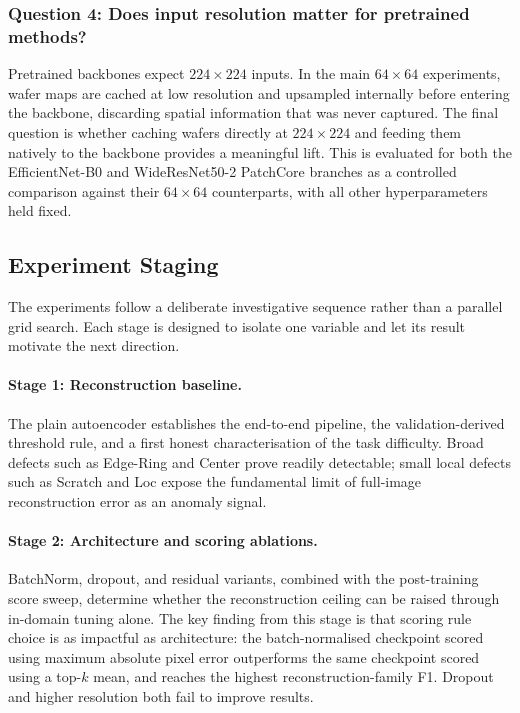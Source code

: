 \documentclass[11pt]{article}
\begin{document}
\subsubsection{Question 4: Does input resolution matter for pretrained methods?}

Pretrained backbones expect $224\!\times\!224$ inputs. In the main
$64\!\times\!64$ experiments, wafer maps are cached at low resolution and
upsampled internally before entering the backbone, discarding spatial
information that was never captured. The final question is whether caching
wafers directly at $224\!\times\!224$ and feeding them natively to the backbone
provides a meaningful lift. This is evaluated for both the EfficientNet-B0
and WideResNet50-2 PatchCore branches as a controlled comparison against
their $64\!\times\!64$ counterparts, with all other hyperparameters held fixed.

\subsection{Experiment Staging}

The experiments follow a deliberate investigative sequence rather than a
parallel grid search. Each stage is designed to isolate one variable and let
its result motivate the next direction.

\paragraph{Stage 1: Reconstruction baseline.}
The plain autoencoder establishes the end-to-end pipeline, the validation-derived
threshold rule, and a first honest characterisation of the task difficulty.
Broad defects such as Edge-Ring and Center prove readily detectable; small
local defects such as Scratch and Loc expose the fundamental limit of
full-image reconstruction error as an anomaly signal.

\paragraph{Stage 2: Architecture and scoring ablations.}
BatchNorm, dropout, and residual variants, combined with the post-training
score sweep, determine whether the reconstruction ceiling can be raised
through in-domain tuning alone. The key finding from this stage is that
scoring rule choice is as impactful as architecture: the batch-normalised
checkpoint scored using maximum absolute pixel error outperforms the same
checkpoint scored using a top-$k$ mean, and reaches the highest
reconstruction-family F1. Dropout and higher resolution both fail to improve results.
\end{document}
